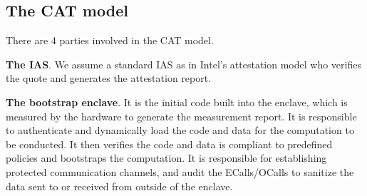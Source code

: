 {%


\subsection{The CAT model}

There are 4 parties involved in the CAT model.


\vspace{3pt}\noindent\textbf{The IAS}. We assume a standard IAS as in Intel's attestation model who verifies the quote and generates the attestation report. 

\vspace{3pt}\noindent\textbf{The bootstrap enclave}. It is the initial code built into the enclave, which is measured by the hardware to generate the measurement report. It is responsible to authenticate and dynamically load the code and data for the computation to be conducted. It then verifies the code and data is compliant to predefined policies and bootstraps the computation. It is responsible for establishing protected communication channels, and audit the ECalls/OCalls to sanitize the data sent to or received from outside of the enclave.

}
